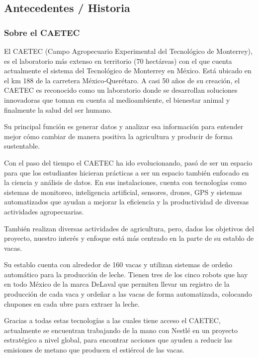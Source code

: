 \subsection{Antecedentes / Historia}

\subsubsection{Sobre el CAETEC}

El CAETEC (Campo Agropecuario Experimental del Tecnológico de Monterrey), es el laboratorio más extenso en territorio (70 hectáreas) con el que cuenta actualmente el sistema del Tecnológico de Monterrey en México. Está ubicado en el km 188 de la carretera México-Querétaro. A casi 50 años de su creación, el CAETEC es reconocido como un laboratorio donde se desarrollan soluciones innovadoras que toman en cuenta al medioambiente, el bienestar animal y finalmente la salud del ser humano.

Su principal función es generar datos y analizar esa información para entender mejor cómo cambiar de manera positiva la agricultura y producir de forma sustentable.

Con el paso del tiempo el CAETEC ha ido evolucionando, pasó de ser un espacio para que los estudiantes hicieran prácticas a ser un espacio también enfocado en la ciencia y análisis de datos. En sus instalaciones, cuenta con tecnologías como sistemas de monitoreo, inteligencia artificial, sensores, drones, GPS y sistemas automatizados que ayudan a mejorar la eficiencia y la productividad de diversas actividades agropecuarias.

También realizan diversas actividades de agricultura, pero, dados los objetivos del proyecto, nuestro interés y enfoque está más centrado en la parte de su establo de vacas.

Su establo cuenta con alrededor de 160 vacas y utilizan sistemas de ordeño automático para la producción de leche. Tienen tres de los cinco robots que hay en todo México de la marca DeLaval que permiten llevar un registro de la producción de cada vaca y ordeñar a las vacas de forma automatizada, colocando chupones en cada ubre para extraer la leche.

Gracias a todas estas tecnologías a las cuales tiene acceso el CAETEC, actualmente se encuentran trabajando de la mano con Nestlé en un proyecto estratégico a nivel global, para encontrar acciones que ayuden a reducir las emisiones de metano que producen el estiércol de las vacas.

